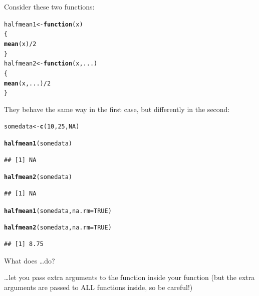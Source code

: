 \documentclass[12pt,a4paper]{scrartcl}\usepackage[]{graphicx}\usepackage[]{color}
\makeatletter
\newcommand{\hlnum}[1]{\textcolor[rgb]{0.686,0.059,0.569}{#1}}%
\newcommand{\hlopt}[1]{\textcolor[rgb]{0,0,0}{#1}}%
\newcommand{\hlstd}[1]{\textcolor[rgb]{0.345,0.345,0.345}{#1}}%
\newcommand{\hlkwa}[1]{\textcolor[rgb]{0.161,0.373,0.58}{\textbf{#1}}}%
\newcommand{\hlkwb}[1]{\textcolor[rgb]{0.69,0.353,0.396}{#1}}%
\newcommand{\hlkwc}[1]{\textcolor[rgb]{0.333,0.667,0.333}{#1}}%
\newcommand{\hlkwd}[1]{\textcolor[rgb]{0.737,0.353,0.396}{\textbf{#1}}}%
\newenvironment{kframe}{%
 \def\at@end@of@kframe{}%
 \ifinner\ifhmode%
  \def\at@end@of@kframe{\end{minipage}}%
  \begin{minipage}{\columnwidth}%
 \fi\fi%
 \def\FrameCommand##1{\hskip\@totalleftmargin \hskip-\fboxsep
 \colorbox{shadecolor}{##1}\hskip-\fboxsep
     \hskip-\linewidth \hskip-\@totalleftmargin \hskip\columnwidth}%
 \MakeFramed {\advance\hsize-\width
   \@totalleftmargin\z@ \linewidth\hsize
   \@setminipage}}%
 {\par\unskip\endMakeFramed%
 \at@end@of@kframe}
\newenvironment{knitrout}{}{} %
\makeatother
\begin{document}
\begin{Exercise}[difficulty=1, title={Understand the \texttt{\dots}}]
Consider these two functions:
\begin{knitrout}
\color{fgcolor}\begin{kframe}
\begin{alltt}
\hlstd{halfmean1} \hlkwb{<-} \hlkwa{function}\hlstd{(}\hlkwc{x}\hlstd{)}
\hlstd{\{}
  \hlkwd{mean}\hlstd{(x)}\hlopt{/}\hlnum{2}
\hlstd{\}}
\hlstd{halfmean2} \hlkwb{<-} \hlkwa{function}\hlstd{(}\hlkwc{x}\hlstd{,}\hlkwc{...}\hlstd{)}
\hlstd{\{}
  \hlkwd{mean}\hlstd{(x,...)}\hlopt{/}\hlnum{2}
\hlstd{\}}
\end{alltt}
\end{kframe}
\end{knitrout}

They behave the same way in the first case, but differently in the second:
\begin{knitrout}
\color{fgcolor}\begin{kframe}
\begin{alltt}
\hlstd{somedata} \hlkwb{<-} \hlkwd{c}\hlstd{(}\hlnum{10}\hlstd{,} \hlnum{25}\hlstd{,} \hlnum{NA}\hlstd{)}

\hlkwd{halfmean1}\hlstd{(somedata)}
\end{alltt}
\begin{verbatim}
## [1] NA
\end{verbatim}
\begin{alltt}
\hlkwd{halfmean2}\hlstd{(somedata)}
\end{alltt}
\begin{verbatim}
## [1] NA
\end{verbatim}
\begin{alltt}
\hlkwd{halfmean1}\hlstd{(somedata,} \hlkwc{na.rm}\hlstd{=}\hlnum{TRUE}\hlstd{)}
\end{alltt}


{\ttfamily\noindent\bfseries\color{errorcolor}{\#\# Error in halfmean1(somedata, na.rm = TRUE): unused argument (na.rm = TRUE)}}\begin{alltt}
\hlkwd{halfmean2}\hlstd{(somedata,} \hlkwc{na.rm}\hlstd{=}\hlnum{TRUE}\hlstd{)}
\end{alltt}
\begin{verbatim}
## [1] 8.75
\end{verbatim}
\end{kframe}
\end{knitrout}
What does \dots do?
\end{Exercise}
\begin{Answer}
\dots let you pass extra arguments to the function inside your function (but the extra arguments are passed to ALL functions inside, so be careful!)
\end{Answer}
\end{document}

